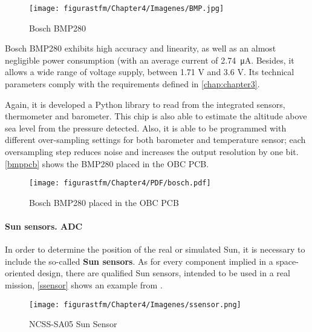 \begin{figure} [H]
			\centering
			\texttt{[image: figurastfm/Chapter4/Imagenes/BMP.jpg]}
			\caption{Bosch BMP280 \cite{bosch}} \label{bmp}
			\vspace{-0.5cm}
\end{figure}



Bosch BMP280 exhibits high accuracy and linearity, as well as an almost negligible power consumption (with an average current of \SI{2.74}{\micro A}. Besides, it allows a wide range of voltage supply, between 1.71 V and 3.6 V. Its technical parameters comply with the requirements defined in \autoref{chap:chapter3}.

Again, it is developed a Python library to  read from the integrated sensors, thermometer and barometer. This chip is also able to estimate the altitude above sea level from the pressure detected. Also, it is able to be programmed with different over-sampling settings for both barometer and temperature sensor; each oversampling step reduces noise and increases the output resolution by one bit. \autoref{bmppcb} shows the BMP280 placed in the \acrshort{OBC} \acrshort{PCB}.

\begin{figure} [H]
			\centering
			\texttt{[image: figurastfm/Chapter4/PDF/bosch.pdf]}
			\caption{Bosch BMP280 placed in the \acrshort{OBC} \acrshort{PCB}} \label{bmppcb}
			\vspace{-2cm}
\end{figure}


\paragraph{Sun sensors. ADC}

In order to determine the position of the real or simulated Sun, it is necessary to include the so-called \textbf{Sun sensors}. As for every component implied in a space-oriented design, there are qualified Sun sensors, intended to be used in a real mission, \autoref{ssensor} shows an example from \cite{csatshop}.


\begin{figure} [H]
			\centering
			\texttt{[image: figurastfm/Chapter4/Imagenes/ssensor.png]}
			\caption{NCSS-SA05 Sun Sensor} \label{ssensor}
\end{figure}

